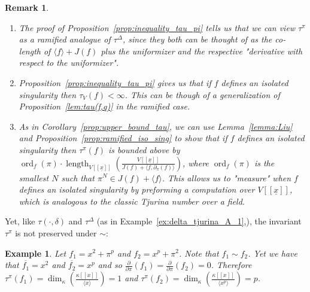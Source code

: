 \documentclass{article}
\newtheorem{example}[theorem]{Example}
\newtheorem{remark}[theorem]{Remark}
\DeclareMathOperator{\ord}{ord}
\DeclareMathOperator{\length}{length}
\newcommand{\pder}{\frac{\partial}{\partial \pi}}
\numberwithin{theorem}{section}
\begin{document}
\begin{remark}
\begin{enumerate}
    \item \textup{The proof of Proposition~\ref{prop:inequality_tau_pi} tells us that we can view $\tau^\pi$  as a ramified analogue of $\tau^\Delta$, since they both can be thought of as the co-length of $\langle f\rangle+J(f)$ plus the uniformizer and the respective "derivative with respect to the uniformizer". }
    \item \textup{Proposition~\ref{prop:inequality_tau_pi} gives us that if $f$ defines an isolated singularity then $\tau_V(f) <\infty$. This can be though of a generalization of Proposition~\ref{lem:tau(f,q)} in the ramified case. }
    \item \textup{As in Corollary~\ref{prop:upper_bound_tau}, we can use Lemma~\ref{lemma:Liu} and Proposition~\ref{prop:ramified_iso_sing} to show that if $f$ defines an isolated singularity then $\tau^\pi(f)$ is bounded above by $\ord_f(\pi) \cdot \length_{V[[\underline{x}]]} \left(\frac{V[[\underline{x}]]}{J(f) + \langle f, \partial_\pi(f) \rangle}\right)$, where $\ord_f(\pi)$ is the smallest $N$ such that $\pi^N \in J(f)+\langle f \rangle$. This allows us to "measure" when $f$ defines an isolated singularity by preforming a computation over $V[[\underline{x}]]$, which is analogous to the classic Tjurina number over a field. }
\end{enumerate}
\end{remark}

Yet, like $\tau(\cdot, \delta)$ and $\tau^\Delta$ (as in Example~\ref{ex:delta_tjurina_A_1},), the invariant $\tau^\pi$ is not preserved under $\sim$:

\begin{example}
    \textup{Let $f_1=x^2+\pi^p$ and $f_2=x^p +\pi^2$. Note that $f_1 \sim f_2$. Yet we have that $\overline{f_1}=x^2$ and $\overline{f_2}=x^p$ and so $\pder(f_1)=\pder(f_2)=0$.  Therefore $\tau^\pi(f_1)=\dim_\kappa\left(\frac{\kappa[[x]]}{\langle x \rangle}\right)=1$ and $\tau^\pi(f_2)=\dim_\kappa\left(\frac{\kappa[[x]]}{\langle x^p\rangle}\right)=p$. }
\end{example}





\end{document}
